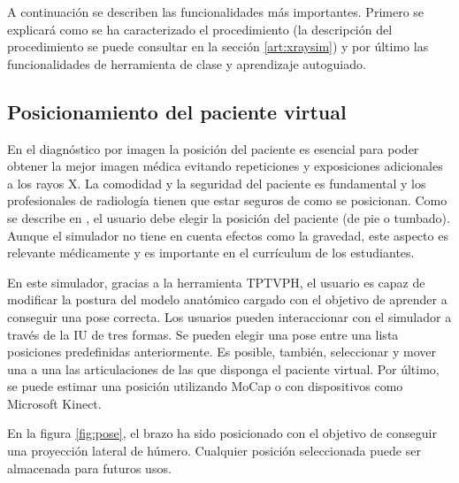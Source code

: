 A continuación se describen las funcionalidades más importantes. Primero se explicará como se ha caracterizado el procedimiento (la descripción del procedimiento se puede consultar en la sección \ref{art:xraysim}) y por último las funcionalidades de herramienta de clase y aprendizaje autoguiado.




\subsection{Posicionamiento del paciente virtual}
\label{xray:posing}

En el diagnóstico por imagen la posición del paciente es esencial para poder obtener la mejor imagen médica evitando repeticiones y exposiciones adicionales a los rayos X. La comodidad y la seguridad del paciente es fundamental y los profesionales de radiología tienen que estar seguros de como se posicionan. Como se describe en \cite{carver2012medical,manualpractico}, el usuario debe elegir la posición del paciente (de pie o tumbado). Aunque el simulador no tiene en cuenta efectos como la gravedad, este aspecto es relevante médicamente y es importante en el currículum de los estudiantes.

En este simulador, gracias a la herramienta \ac{TPTVPH}, el usuario es capaz de modificar la postura del modelo anatómico cargado con el objetivo de aprender a conseguir una pose correcta. Los usuarios pueden interaccionar con el simulador a través de la \ac{IU} de tres formas. Se pueden elegir una pose entre una lista posiciones predefinidas anteriormente. Es posible, también, seleccionar y mover una a una las articulaciones de las que disponga el paciente virtual. Por último, se puede estimar una posición utilizando \ac{MoCap} o con dispositivos como Microsoft Kinect. 

En la figura \ref{fig:pose}, el brazo ha sido posicionado con el objetivo de conseguir una proyección lateral de húmero. Cualquier posición seleccionada puede ser almacenada para futuros usos.



		
